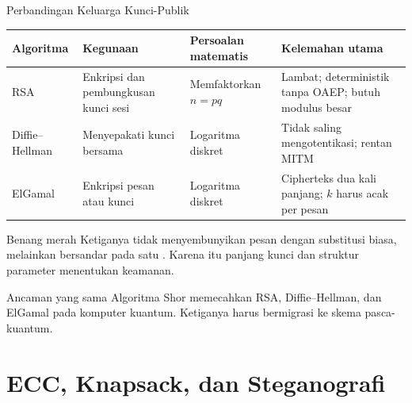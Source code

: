 \documentclass[aspectratio=169,11pt]{beamer}
\begin{document}
\begin{frame}{Perbandingan Keluarga Kunci-Publik}
    \scriptsize
    \begin{tabularx}{\linewidth}{@{}>{\raggedright\arraybackslash}p{1.6cm} >{\raggedright\arraybackslash}p{3.2cm} >{\raggedright\arraybackslash}p{3.5cm} >{\raggedright\arraybackslash}X@{}}
        \toprule
        \textbf{Algoritma} & \textbf{Kegunaan} & \textbf{Persoalan matematis} & \textbf{Kelemahan utama} \\
        \midrule
        RSA & Enkripsi dan pembungkusan kunci sesi & Memfaktorkan $n=pq$ & Lambat; deterministik tanpa OAEP; butuh modulus besar \\
        \addlinespace[1pt]
        Diffie--Hellman & Menyepakati kunci bersama & Logaritma diskret & Tidak saling mengotentikasi; rentan MITM \\
        \addlinespace[1pt]
        ElGamal & Enkripsi pesan atau kunci & Logaritma diskret & Cipherteks dua kali panjang; $k$ harus acak per pesan \\
        \bottomrule
    \end{tabularx}
    \vspace{0.12cm}
    \begin{block}{Benang merah}
        \footnotesize
        Ketiganya tidak menyembunyikan pesan dengan substitusi biasa, melainkan
        bersandar pada satu .
        Karena itu panjang kunci dan struktur parameter menentukan keamanan.
    \end{block}
    \begin{alertblock}{Ancaman yang sama}
        \footnotesize
        Algoritma Shor memecahkan RSA, Diffie--Hellman, dan ElGamal pada komputer
        kuantum. Ketiganya harus bermigrasi ke skema pasca-kuantum.
    \end{alertblock}
\end{frame}

\section{ECC, Knapsack, dan Steganografi}
\end{document}
